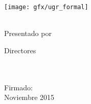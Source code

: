 \begin{titlepage}
    \begin{center}
        \large
        \vspace*{1.5cm}
        \texttt{[image: gfx/ugr\_formal]} \\

        \vspace{1.5cm}

        {\color{ugrOrange}\spacedallcaps{\myTitle}} \\ \bigskip
	{\textcolor{ugrGray} {\small Presentado por}} \\ \bigskip
        \spacedlowsmallcaps{\myName}

        \vspace{1.5cm}
\textcolor{ugrGray}{\small Directores }\normalsize\\
        \large\spacedlowsmallcaps{\myDirectorOne}\\
        \large\spacedlowsmallcaps{\myDirectorTwo}\\
        \vspace{3cm}

        {\small Firmado: \myName }\\ \bigskip
	Noviembre 2015


    \end{center}
\end{titlepage}   
